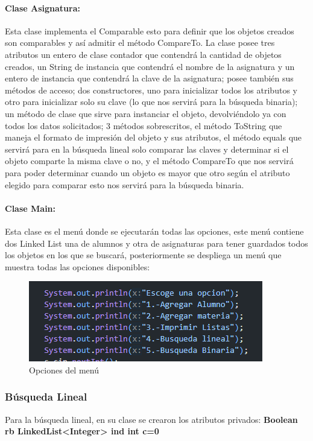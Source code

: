\documentclass{report}
\begin{document}
\paragraph{Clase Asignatura:}
Esta clase implementa el Comparable esto para definir que los objetos creados son comparables y así admitir el método CompareTo. La clase posee tres atributos un entero de clase contador que contendrá la cantidad de objetos creados, un String de instancia que contendrá el nombre de la asignatura y un entero de instancia que contendrá la clave de la asignatura; posee también sus métodos de acceso; dos constructores, uno para inicializar todos los atributos y otro para inicializar solo su clave (lo que nos servirá para la búsqueda binaria); un método de clase que sirve para instanciar el objeto, devolviéndolo ya con todos los datos solicitados; 3 métodos sobrescritos, el método ToString que maneja el formato de impresión del objeto y sus atributos, el método equals que servirá para en la búsqueda lineal solo comparar las claves y determinar si el objeto comparte la misma clave o no, y el método CompareTo que nos servirá para poder determinar cuando un objeto es mayor que otro según el atributo elegido para comparar esto nos servirá para la búsqueda binaria.
\paragraph{Clase Main:}
Esta clase es el menú donde se ejecutarán todas las opciones, este menú contiene dos Linked List una de alumnos y otra de asignaturas para tener guardados todos los objetos en los que se buscará, posteriormente se despliega un menú que muestra todas las opciones disponibles:

\begin{figure}[h]
    \centering
    \includegraphics[width=0.75\linewidth]{Menu.png}
    \caption{Opciones del menú}
    
\end{figure}
\subsubsection{Búsqueda Lineal}
Para la búsqueda lineal, en su clase se crearon los atributos privados:
\textbf{Boolean rb
LinkedList<Integer> ind
int c=0}
\end{document}
